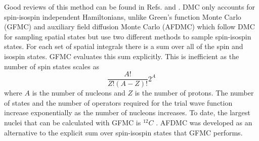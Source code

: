 Good reviews of this method can be found in Refs. \cite{foulkes2001} and  \cite{carlson2015}. DMC only accounts for spin-isospin independent Hamiltonians, unlike Green's function Monte Carlo (GFMC) and auxiliary field diffusion Monte Carlo (AFDMC) which follow DMC for sampling spatial states but use two different methods to sample spin-isospin states. For each set of spatial integrals there is a sum over all of the spin and isospin states. GFMC evaluates this sum explicitly. This is inefficient as the number of spin states scales as
\begin{equation}
   \frac{A!}{Z!(A-Z)!}2^A
\end{equation}
where $A$ is the number of nucleons and $Z$ is the number of protons.
The number of states and the number of operators required for the trial wave function increase exponentially as the number of nucleons increases. To date, the largest nuclei that can be calculated with GFMC is ${}^{12}C$ \cite{lovato2013,lovato2014,lovato2015}. AFDMC was developed as an alternative to the explicit sum over spin-isospin states that GFMC performs.

